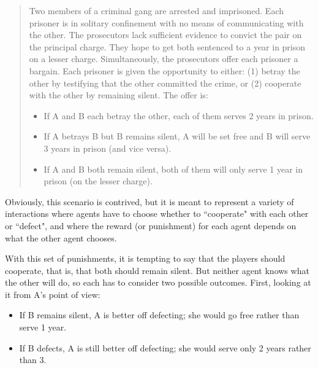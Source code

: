 \documentclass[12pt]{book}
\theoremstyle{exercise}
\begin{document}
\begin{quote}
Two members of a criminal gang are arrested and imprisoned. Each prisoner is in solitary confinement with no means of communicating with the other. The prosecutors lack sufficient evidence to convict the pair on the principal charge. They hope to get both sentenced to a year in prison on a lesser charge. Simultaneously, the prosecutors offer each prisoner a bargain. Each prisoner is given the opportunity to either: (1) betray the other by testifying that the other committed the crime, or (2) cooperate with the other by remaining silent. The offer is:

\begin{itemize}

\item If A and B each betray the other, each of them serves 2 years in prison.

\item If A betrays B but B remains silent, A will be set free and B will serve 3 years in prison (and vice versa).

\item If A and B both remain silent, both of them will only serve 1 year in prison (on the lesser charge).

\end{itemize}

\end{quote}

Obviously, this scenario is contrived, but it is meant to represent a variety of interactions where agents have to choose whether to ``cooperate" with each other or ``defect", and where the reward (or punishment) for each agent depends on what the other agent chooses.

With this set of punishments, it is tempting to say that the players should cooperate, that is, that both should remain silent.  But neither agent knows what the other will do, so each has to consider two possible outcomes.  First, looking at it from A's point of view:

\begin{itemize}

\item If B remains silent, A is better off defecting; she would go free rather than serve 1 year.

\item If B defects, A is still better off defecting; she would serve only 2 years rather than 3.

\end{itemize}
\end{document}
